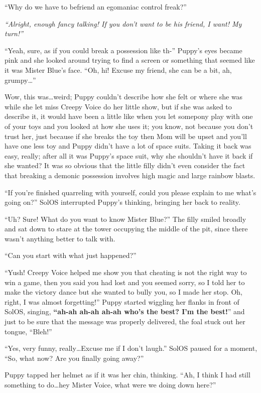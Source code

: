 ``Why do we have to befriend an egomaniac control freak?''

\emph{``Alright, enough fancy talking! If you don't want to be his friend, I want! My turn!''}

``Yeah, sure, as if you could break a possession like th-'' Puppy's eyes became pink and she looked around trying to find a screen or something that seemed like it was Mister Blue's face. ``Oh, hi! Excuse my friend, she can be a bit, ah, grumpy\dots''

Wow, this was\dots weird; Puppy couldn't describe how she felt or where she was while she let miss Creepy Voice do her little show, but if she was asked to describe it, it would have been a little like when you let somepony play with one of your toys and you looked at how she uses it; you know, not because you don't trust her, just because if she breaks the toy then Mom will be upset and you'll have one less toy and Puppy didn't have a lot of space suits. Taking it back was easy, really; after all it was Puppy's space suit, why she shouldn't have it back if she wanted? It was so obvious that the little filly didn't even consider the fact that breaking a demonic possession involves high magic and large rainbow blasts.

``If you're finished quarreling with yourself, could you please explain to me what's going on?'' SolOS interrupted Puppy's thinking, bringing her back to reality.

``Uh? Sure! What do you want to know Mister Blue?'' The filly smiled broadly and sat down to stare at the tower occupying the middle of the pit, since there wasn't anything better to talk with.

``Can you start with what just happened?''

``Yush! Creepy Voice helped me show you that cheating is not the right way to win a game, then you said you had lost and you seemed sorry, so I told her to make the victory dance but she wanted to bully you, so I made her stop. Oh, right, I was almost forgetting!'' Puppy started wiggling her flanks in front of SolOS, singing, \textbf{``ah-ah ah-ah ah-ah who's the best? I'm the best!}'' and just to be sure that the message was properly delivered, the foal stuck out her tongue, ``Bleh!''

``Yes, very funny, really\dots Excuse me if I don't laugh.'' SolOS paused for a moment, ``So, what now? Are you finally going away?''

Puppy tapped her helmet as if it was her chin, thinking. ``Ah, I think I had still something to do\dots hey Mister Voice, what were we doing down here?''

